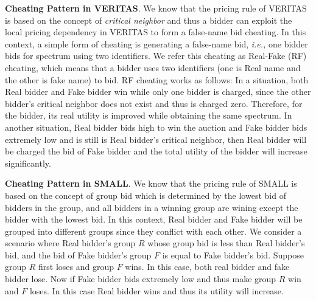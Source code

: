 \documentclass{sig-alternate}
\begin{document}
\textbf{Cheating Pattern in VERITAS}. We know that the pricing rule of VERITAS is based on the concept of \emph{critical neighbor} and thus a bidder can exploit the local pricing dependency in VERITAS to form a false-name bid cheating.  In this context, a simple form of cheating is generating a false-name bid, \emph{i.e.,} one bidder bids for spectrum using two identifiers. We refer this cheating as Real-Fake (RF) cheating, which means that a bidder uses two identifiers (one is Real name and the other is fake name) to bid. RF cheating works as follows: In a situation, both Real bidder and Fake bidder win while only one bidder is charged, since the other bidder's critical neighbor does not exist and thus is charged zero. Therefore, for the bidder, its real utility is improved while obtaining the same spectrum.
In another situation, Real bidder bids high to win the auction and Fake bidder bids extremely low and is still is Real bidder's critical neighbor, then Real bidder will be charged the bid of Fake bidder and the total utility of the bidder will increase significantly.

\textbf{Cheating Pattern in SMALL}. We know that the pricing rule of SMALL is based on the concept of group bid which is determined by the lowest bid of bidders in the group, and all bidders in a winning group are wining except the bidder with the lowest bid. In this context, Real bidder and Fake bidder will be grouped into different groups since they conflict with each other. We consider a scenario where Real bidder's group $R$ whose group bid is less than Real bidder's bid, and the bid of Fake bidder's group $F$ is equal to Fake bidder's bid.  Suppose group $R$ first loses and group $F$ wins. In this case, both real bidder and fake bidder lose. Now if Fake bidder bids extremely low and thus make group $R$ win and $F$ loses. In this case Real bidder wins and thus its utility will increase.



\end{document}
